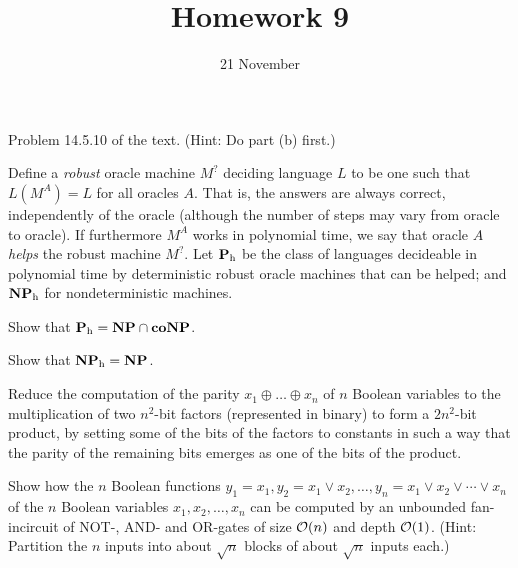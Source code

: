 \documentclass{../math167}
\title{Homework 9}
\author{}
\date{21 November}
\begin{document}
\begin{problems}
\item Problem 14.5.10 of the text.  (Hint: Do part (b) first.)
  \begin{book}
    \newcommand{\h}{_\mathrm h}

    Define a \emph{robust} oracle machine \(M^?\) deciding language
    \(L\) to be one such that \(L(M^A) = L\) for all oracles \(A\).
    That is, the answers are always correct, independently of the
    oracle (although the number of steps may vary from oracle to
    oracle).  If furthermore \(M^A\) works in polynomial time, we say
    that oracle \(A\) \emph{helps} the robust machine \(M^?\).  Let
    \(\P\h\) be the class of languages decideable in polynomial time
    by deterministic robust oracle machines that can be helped; and
    \(\NP\h\) for nondeterministic machines.
    \begin{problems}
    \item Show that \(\P\h = \NP \cap \co\NP\).
    \item Show that \(\NP\h = \NP\).
    \end{problems}
  \end{book}

  \begin{solution}
    \begin{problems}
    \item
    \item
    \end{problems}
  \end{solution}

\item Reduce the computation of the parity
  \(x_1 \oplus \dots \oplus x_n\) of \(n\) Boolean variables to the
  multiplication of two \(n^2\)-bit factors (represented in binary) to
  form a \(2n^2\)-bit product, by setting some of the bits of the
  factors to constants in such a way that the parity of the remaining
  bits emerges as one of the bits of the product.

  \begin{solution}
  \end{solution}

\item Show how the \(n\) Boolean functions
  \(y_1=x_1, y_2 = x_1 \lor x_2, \dots, y_n = x_1 \lor x_2 \lor \cdots
  \lor x_n\) of the \(n\) Boolean variables \(x_1, x_2, \dots, x_n\)
  can be computed by an unbounded fan-incircuit of NOT-, AND- and
  OR-gates of size \(\mathcal O(n)\) and depth \(\mathcal O(1)\). (Hint: Partition the
  \(n\) inputs into about \(\sqrt n\) blocks of about \(\sqrt n\)
  inputs each.)

  \begin{solution}
  \end{solution}

\end{problems}
\end{document}
